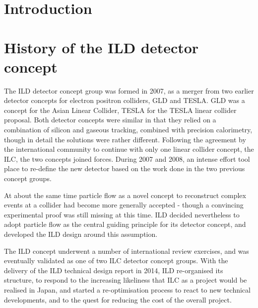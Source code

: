\documentclass[%
 amsmath,amssymb,
 aps,
]{revtex4-1}
\begin{document}


\maketitle
\tableofcontents

\newpage

\section{\label{sec:level1}Introduction}

\section{History of the ILD detector concept}
The ILD detector concept group was formed in 2007, as a merger from two earlier detector concepts for electron positron colliders, GLD and TESLA. GLD was a concept for the Asian Linear Collider, TESLA for the TESLA linear collider proposal. Both detector concepts were similar in that they relied on a combination of silicon and gaseous tracking, combined with precision calorimetry, though in detail the solutions were rather different. Following the agreement by the international community to continue with only one linear collider concept, the ILC, the two concepts joined forces. During 2007 and 2008, an intense effort tool place to re-define the new detector based on the work done in the two previous concept groups. 

At about the same time particle flow as a novel concept to reconstruct complex events at a collider had become more generally accepted - though a convincing experimental proof was still missing at this time. ILD decided nevertheless to adopt particle flow as the central guiding principle for its detector concept, and developed the ILD design around this assumption. 

The ILD concept underwent a number of international review exercises, and was eventually validated as one of two ILC detector concept groups. With the delivery of the ILD technical design report in 2014, ILD re-organised its structure, to respond to the increasing likeliness that ILC as a project would be realised in Japan, and started a re-optimisation process to react to new technical developments, and to the quest for reducing the cost of the overall project. 
\end{document}
